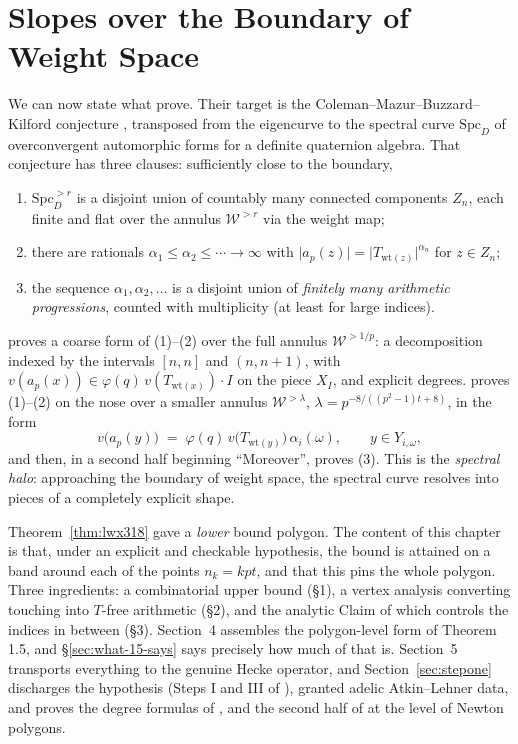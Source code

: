 \chapter{Slopes over the Boundary of Weight Space}
\label{chap:lwx-slopes}

We can now state what \cite{LWX} prove.  Their target is the Coleman--Mazur--Buzzard--Kilford
conjecture \cite[Conjecture 1.2]{LWX}, transposed from the eigencurve to the spectral curve
$\mathrm{Spc}_D$ of overconvergent automorphic forms for a definite quaternion algebra.  That
conjecture has three clauses: sufficiently close to the boundary,
\begin{enumerate}
  \item $\mathrm{Spc}^{>r}_D$ is a disjoint union of countably many connected components $Z_n$,
    each finite and flat over the annulus $\mathcal{W}^{>r}$ via the weight map;
  \item there are rationals $\alpha_1 \leq \alpha_2 \leq \cdots \to \infty$ with
    $\lvert a_p(z)\rvert = \lvert T_{\mathrm{wt}(z)}\rvert^{\alpha_n}$ for $z \in Z_n$;
  \item the sequence $\alpha_1, \alpha_2, \dots$ is a disjoint union of \emph{finitely many
    arithmetic progressions}, counted with multiplicity (at least for large indices).
\end{enumerate}
\cite[Theorem 1.3]{LWX} proves a coarse form of (1)--(2) over the full annulus
$\mathcal{W}^{>1/p}$: a decomposition indexed by the intervals $[n,n]$ and $(n,n+1)$, with
$v(a_p(x)) \in \varphi(q)\,v(T_{\mathrm{wt}(x)})\cdot I$ on the piece $X_I$, and explicit degrees.
\cite[Theorem 1.5]{LWX} proves (1)--(2) on the nose over a smaller annulus
$\mathcal{W}^{>\lambda}$, $\lambda = p^{-8/((p^{2}-1)t+8)}$, in the form
\[
  v\bigl(a_p(y)\bigr) \;=\; \varphi(q)\,v\bigl(T_{\mathrm{wt}(y)}\bigr)\,\alpha_i(\omega),
  \qquad y \in Y_{i,\omega},
  \tag{1.5.1}
\]
and then, in a second half beginning ``Moreover'', proves (3).  This is the \emph{spectral halo}:
approaching the boundary of weight space, the spectral curve resolves into pieces of a completely
explicit shape.

Theorem~\ref{thm:lwx318} gave a \emph{lower} bound polygon.  The content of this chapter is that,
under an explicit and checkable hypothesis, the bound is attained on a band around each of the
points $n_k = kpt$, and that this pins the whole polygon.  Three ingredients:
a combinatorial upper bound (\S1), a vertex analysis converting touching into $T$-free
arithmetic (\S2), and the analytic Claim of \cite[\S4.2]{LWX} which controls the indices in
between (\S3).  Section~4 assembles the polygon-level form of Theorem 1.5, and
\S\ref{sec:what-15-says} says precisely how much of \cite[Theorem 1.5]{LWX} that is.
Section~5 transports everything to the genuine Hecke operator, and
Section~\ref{sec:stepone} discharges the hypothesis (Steps I and III of \cite[\S3.23]{LWX}),
granted adelic Atkin--Lehner data, and proves the degree formulas of \cite[Theorem 1.3]{LWX},
\cite[Corollary 1.4]{LWX} and the second half of \cite[Theorem 1.5]{LWX} at the level of Newton
polygons.


